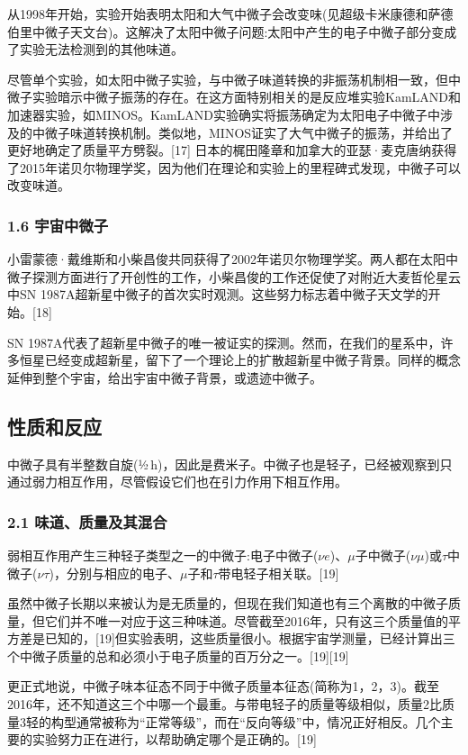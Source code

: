 从1998年开始，实验开始表明太阳和大气中微子会改变味(见超级卡米康德和萨德伯里中微子天文台)。这解决了太阳中微子问题:太阳中产生的电子中微子部分变成了实验无法检测到的其他味道。

尽管单个实验，如太阳中微子实验，与中微子味道转换的非振荡机制相一致，但中微子实验暗示中微子振荡的存在。在这方面特别相关的是反应堆实验KamLAND和加速器实验，如MINOS。KamLAND实验确实将振荡确定为太阳电子中微子中涉及的中微子味道转换机制。类似地，MINOS证实了大气中微子的振荡，并给出了更好地确定了质量平方劈裂。[17] 日本的梶田隆章和加拿大的亚瑟·麦克唐纳获得了2015年诺贝尔物理学奖，因为他们在理论和实验上的里程碑式发现，中微子可以改变味道。

\subsubsection{1.6 宇宙中微子}
小雷蒙德·戴维斯和小柴昌俊共同获得了2002年诺贝尔物理学奖。两人都在太阳中微子探测方面进行了开创性的工作，小柴昌俊的工作还促使了对附近大麦哲伦星云中SN 1987A超新星中微子的首次实时观测。这些努力标志着中微子天文学的开始。[18]

SN 1987A代表了超新星中微子的唯一被证实的探测。然而，在我们的星系中，许多恒星已经变成超新星，留下了一个理论上的扩散超新星中微子背景。同样的概念延伸到整个宇宙，给出宇宙中微子背景，或遗迹中微子。

\subsection{ 性质和反应}
中微子具有半整数自旋(½ h)，因此是费米子。中微子也是轻子，已经被观察到只通过弱力相互作用，尽管假设它们也在引力作用下相互作用。

\subsubsection{2.1 味道、质量及其混合}
弱相互作用产生三种轻子类型之一的中微子:电子中微子($\nu e$)、$\mu$子中微子($\nu \mu$)或$\tau$中微子($\nu \tau$)，分别与相应的电子、$\mu$子和$\tau$带电轻子相关联。[19]

虽然中微子长期以来被认为是无质量的，但现在我们知道也有三个离散的中微子质量，但它们并不唯一对应于这三种味道。尽管截至2016年，只有这三个质量值的平方差是已知的，[19]但实验表明，这些质量很小。根据宇宙学测量，已经计算出三个中微子质量的总和必须小于电子质量的百万分之一。[19][19]

更正式地说，中微子味本征态不同于中微子质量本征态(简称为1，2，3)。截至2016年，还不知道这三个中哪一个最重。与带电轻子的质量等级相似，质量2比质量3轻的构型通常被称为“正常等级”，而在“反向等级”中，情况正好相反。几个主要的实验努力正在进行，以帮助确定哪个是正确的。[19]

